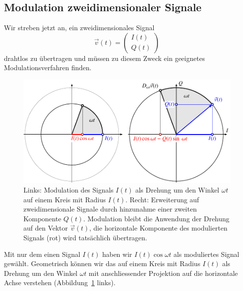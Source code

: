 %
%
%
\subsection{Modulation zweidimensionaler Signale
\label{subsection:modulation}}
Wir streben jetzt an, ein zweidimensionales Signal
\[
\vec{v}(t)
=
\begin{pmatrix}I(t)\\Q(t)\end{pmatrix}
\]
drahtlos zu übertragen und müssen zu diesem Zweck ein geeignetes
Modulationsverfahren finden.

\begin{figure}
\centering
\includegraphics{applications/qam/images/icos.pdf}
\caption{Links: Modulation des Signals $I(t)$ als Drehung um den Winkel
$\omega t$ auf einem Kreis mit Radius $I(t)$.
Recht: Erweiterung auf zweidimensionale Signale durch hinzunahme einer
zweiten Komponente $Q(t)$.
Modulation bleibt die Anwendung der Drehung auf den Vektor $\vec{v}(t)$,
die horizontale Komponente des modulierten Signals (rot) wird tatsächlich
übertragen.
\label{qam:figure:icos}}
\end{figure}
Mit nur dem einen Signal $I(t)$ haben wir $I(t)\cos\omega t$ als moduliertes
Signal gewählt.
Geometrisch können wir das auf einem Kreis mit Radius $I(t)$ als Drehung
um den Winkel $\omega t$ mit anschliessender Projektion auf die horizontale
Achse verstehen (Abbildung~\ref{qam:figure:icos} links).

